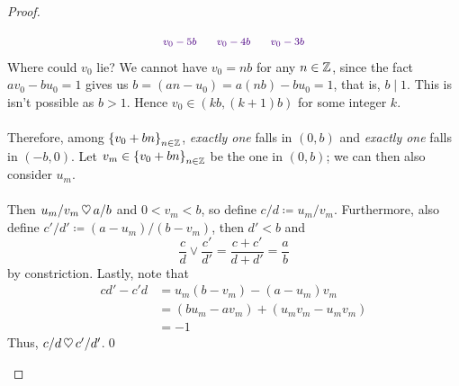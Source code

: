 \begin{proof}
\begin{itemize}
\[\begin{tikzpicture}[scale=1.5]
    \node[color=indigo] at (-0.7,0.25) {\footnotesize $v_0-3b$};
    \node[color=indigo] at (-1.7,0.25) {\footnotesize $v_0-4b$};
    \node[color=indigo] at (-2.7,0.25) {\footnotesize $v_0-5b$};
\end{tikzpicture}\]
Where could $v_0$ lie? We cannot have $v_0 = nb$ for any $n \in \mathbb Z$, since the fact $av_0 - bu_0 = 1$ gives us $b = (an - u_0) = a(nb) - bu_0 = 1$, that is, $b\mid 1$. This is isn't possible as $b > 1$. Hence $v_0 \in (kb,(k+1)b)$ for some integer $k$.\\
\\
Therefore, among $\left\{v_0 + bn\right\}_{n \in \mathbb Z}$, \emph{exactly one} falls in $(0,b)$ and \emph{exactly one} falls in $(-b,0)$. Let $v_m \in \left\{v_0 + bn\right\}_{n \in \mathbb Z}$ be the one in $(0,b)$; we can then also consider $u_m$.\\
\\
Then $u_m/v_m \,\heartsuit\, a/b$ and $0<v_m<b$, so define $c/d \coloneqq u_m/v_m$. Furthermore, also define $c'/d' \coloneqq (a - u_m)/(b-v_m)$, then $d' < b$ and
\[\frac{c}{d} \vee \frac{c'}{d'} = \frac{c+c'}{d+d'} = \frac{a}{b}\]
by constriction. Lastly, note that
\begin{align*}
cd' - c'd &= u_m(b-v_m) - (a-u_m)v_m\\[0.5em]
&= (bu_m - av_m) + (u_mv_m - u_mv_m)\\[0.5em]
&= -1
\end{align*}
Thus, $c/d \,\heartsuit\, c'/d'$.\qed
\end{itemize}\renewcommand{\qedsymbol}{}
\vspace*{-\baselineskip}
\end{proof}

\vspace*{1em}

